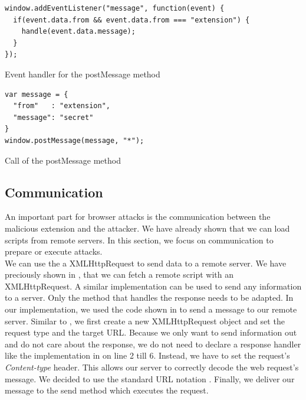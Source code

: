 			\begin{code}
				\begin{lstlisting}
window.addEventListener("message", function(event) {
  if(event.data.from && event.data.from === "extension") {
    handle(event.data.message);
  }
});
				\end{lstlisting}
				\caption{Event handler for the postMessage method}
				\label{postMessageListener}
			\end{code}
			
			\begin{code}
				\begin{lstlisting}
var message = {
  "from"   : "extension",
  "message": "secret"
}
window.postMessage(message, "*");
				\end{lstlisting}
				\caption{Call of the postMessage method}
				\label{postMessageMethod}
			\end{code}
		
		
	
	\subsection{Communication}
	
		An important part for browser attacks is the communication between the malicious extension and the attacker. We have already shown that we can load scripts from remote servers. In this section, we focus on communication to prepare or execute attacks. \\ %
		
		We can use the a XMLHttpRequest to send data to a remote server. We have preciously shown in , that we can fetch a remote script with an XMLHttpRequest. A similar implementation can be used to send any information to a server. Only the method that handles the response needs to be adapted. In our implementation, we used the code shown in  to send a message to our remote server. Similar to , we first create a new XMLHttpRequest object and set the request type and the target URL. Because we only want to send information out and do not care about the response, we do not need to declare a response handler like the implementation in  on line 2 till 6. Instead, we have to set the request's \textit{Content-type} header. This allows our server to correctly decode the web request's message. We decided to use the standard URL notation \cite{w3cUrlSpecifications}. Finally, we deliver our message to the send method which executes the request. 
		
